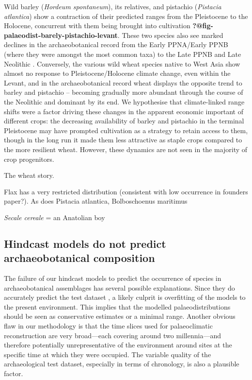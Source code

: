 \documentclass[
  authoryear,
  preprint]{elsarticle}
\begin{document}
Wild barley (\emph{Hordeum spontaneum}), its relatives, and pistachio
(\emph{Pistacia atlantica}) show a contraction of their predicted ranges
from the Pleistocene to the Holocene, concurrent with them being brought
into cultivation \textbf{?@fig-palaeodist-barely-pistachio-levant}.
These two species also see marked declines in the archaeobotanical
record from the Early PPNA/Early PPNB (where they were amongst the most
common taxa) to the Late PPNB and Late Neolithic
\citep{ArranzOtaeguiRoe2023}. Conversely, the various wild wheat species
native to West Asia show almost no response to Pleistocene/Holocene
climate change, even within the Levant, and in the archaeobotanical
record wheat displays the opposite trend to barley and pistachio --
becoming gradually more abundant through the course of the Neolithic and
dominant by its end. We hypothesise that climate-linked range shifts
were a factor driving these changes in the apparent economic important
of different crops: the decreasing availability of barley and pistachio
in the terminal Pleistocene may have prompted cultivation as a strategy
to retain access to them, though in the long run it made them less
attractive as staple crops compared to the more resilient wheat.
However, these dynamics are not seen in the majority of crop
progenitors.

The wheat story.

Flax has a very restricted distribution (consistent with low occurrence
in founders paper?). As does Pistacia atlantica, Bolboschoenus maritimus

\emph{Secale cereale} = an Anatolian boy

\subsection{Hindcast models do not predict archaeobotanical
composition}\label{hindcast-models-do-not-predict-archaeobotanical-composition}

The failure of our hindcast models to predict the occurrence of species
in archaeobotanical assemblages has several possible explanations. Since
they do accurately predict the test dataset , a likely culprit is
overfitting of the models to the present environment. This implies that
the modelled palaeodistributions should be seen as conservative
estimates or a minimal range. Another obvious flaw in our methodology is
that the time slices used for palaeoclimatic reconstruction are very
broad---each covering around two millennia---and therefore potentially
unrepresentative of the environment around sites at the specific time at
which they were occupied. The variable quality of the archaeological
test dataset, especially in terms of chronology, is also a plausible
factor.
\end{document}

